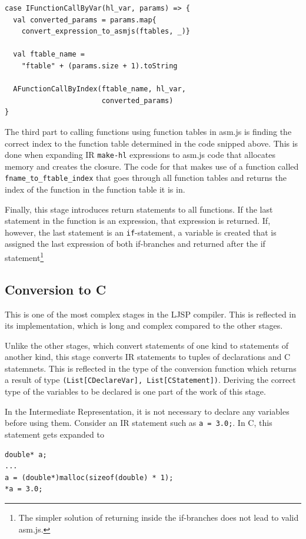 \documentclass[11pt]{report}
\begin{document}
\begin{lstlisting}
case IFunctionCallByVar(hl_var, params) => {
  val converted_params = params.map{
    convert_expression_to_asmjs(ftables, _)}
    
  val ftable_name = 
    "ftable" + (params.size + 1).toString
    
  AFunctionCallByIndex(ftable_name, hl_var, 
                       converted_params)
}
\end{lstlisting}

The third part to calling functions using function tables in asm.js is finding the correct index to the function table determined in the code snipped above. This is done when expanding IR \texttt{make-hl} expressions to asm.js code that allocates memory and creates the closure. The code for that makes use of a function called \texttt{fname_to_ftable_index} that goes through all function tables and returns the index of the function in the function table it is in.

Finally, this stage introduces return statements to all functions. If the last statement in the function is an expression, that expression is returned. If, however, the last statement is an \texttt{if}-statement, a variable is created that is assigned the last expression of both if-branches and returned after the if statement\footnote{The simpler solution of returning inside the if-branches does not lead to valid asm.js.}

\subsection{Conversion to C}
This is one of the most complex stages in the LJSP compiler. This is reflected in its implementation, which is long and complex compared to the other stages.

Unlike the other stages, which convert statements of one kind to statements of another kind, this stage converts IR statements to tuples of declarations and C statemnets. This is reflected in the type of the conversion function which returns a result of type \texttt{(List[CDeclareVar], List[CStatement])}. Deriving the correct type of the variables to be declared is one part of the work of this stage.

In the Intermediate Representation, it is not necessary to declare any variables before using them. Consider an IR statement such as \texttt{a = 3.0;}. In C, this statement gets expanded to
\begin{lstlisting}
double* a;
...
a = (double*)malloc(sizeof(double) * 1);
*a = 3.0;
\end{lstlisting}
\end{document}
